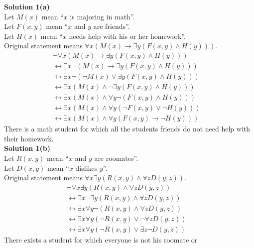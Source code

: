 \textbf{Solution 1(a)} \\
Let $M(x)$ mean ``$x$ is majoring in math''. \\
Let $F(x, y)$ mean ``$x$ and $y$ are friends''. \\
Let $H(x)$ mean ``$x$ needs help with his or her homework''. \\
Original statement means $\forall{x}(M(x) \rightarrow \exists{y}(F(x, y) \wedge H(y)))$.
\begin{align*}
& \neg \forall{x}(M(x) \rightarrow \exists{y}(F(x, y) \wedge H(y))) && \\
&\leftrightarrow    \exists{x} \neg (M(x) \rightarrow \exists{y}(F(x, y) \wedge H(y))) && \\
&\leftrightarrow    \exists{x} \neg (\neg M(x) \vee \exists{y}(F(x, y) \wedge H(y))) && \\
&\leftrightarrow    \exists{x} (M(x) \wedge \neg\exists{y}(F(x, y) \wedge H(y))) && \\
&\leftrightarrow    \exists{x} (M(x) \wedge \forall{y}\neg(F(x, y) \wedge H(y))) && \\
&\leftrightarrow    \exists{x} (M(x) \wedge \forall{y}(\neg F(x, y) \vee \neg H(y))) && \\
&\leftrightarrow    \exists{x} (M(x) \wedge \forall{y}(F(x, y) \rightarrow \neg H(y)))
\end{align*}
There is a math student for which all the students friends do not need help with their homework. \\
\textbf{Solution 1(b)} \\
Let $R(x, y)$ mean ``$x$ and $y$ are roomates''. \\
Let $D(x, y)$ mean ``$x$ dislikes $y$''. \\
Original statement means $\forall{x}\exists{y}(R(x, y) \wedge \forall{z}D(y, z))$.
\begin{align*}
&    \neg \forall{x}\exists{y}(R(x, y) \wedge \forall{z}D(y, z)) && \\
&    \leftrightarrow    \exists{x}\neg\exists{y}(R(x, y) \wedge \forall{z}D(y, z)) && \\
&    \leftrightarrow    \exists{x}\forall{y}\neg(R(x, y) \wedge \forall{z}D(y, z)) && \\
&    \leftrightarrow    \exists{x}\forall{y}(\neg R(x, y) \vee \neg\forall{z}D(y, z)) && \\
&    \leftrightarrow    \exists{x}\forall{y}(\neg R(x, y) \vee \exists{z}\neg D(y, z))
\end{align*}
There exists a student for which everyone is not his roomate or 
